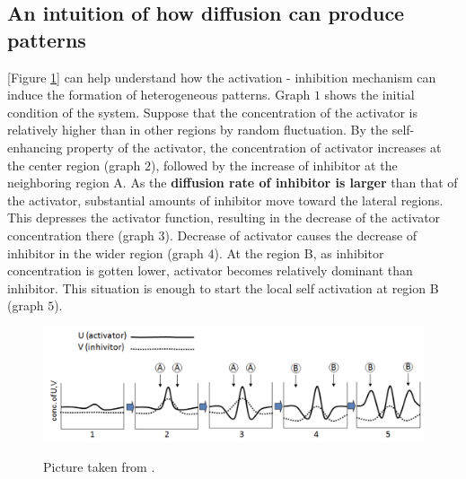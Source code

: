 \subsection*{An intuition of how diffusion can produce patterns}
[Figure \ref{fig:key}] can help understand how the activation - inhibition mechanism can induce the formation of heterogeneous patterns. Graph $1$ shows the initial condition of the system. Suppose that the concentration of the
activator is relatively higher than in other regions by random fluctuation. By the
self-enhancing property of the activator, the concentration of activator increases at the
center region (graph $2$), followed by the increase of inhibitor at the neighboring region A.
As the \textbf{diffusion rate of inhibitor is larger} than that of the activator, substantial
amounts of inhibitor move toward the lateral regions. This depresses the activator
function, resulting in the decrease of the activator concentration there (graph $3$).
Decrease of activator causes the decrease of inhibitor in the wider region (graph $4$). At
the region B, as inhibitor concentration is gotten lower, activator becomes relatively
dominant than inhibitor. This situation is enough to start the local self activation at
region B (graph $5$). 
\begin{figure}[H]
    \centering
    \includegraphics[width=0.8\linewidth]{latex_source/images/turing/key_mechanism.png}
    \label{fig:key}
    \caption{ Picture taken from \cite{bio_article}.}
   \label{fig:key}
\end{figure}

